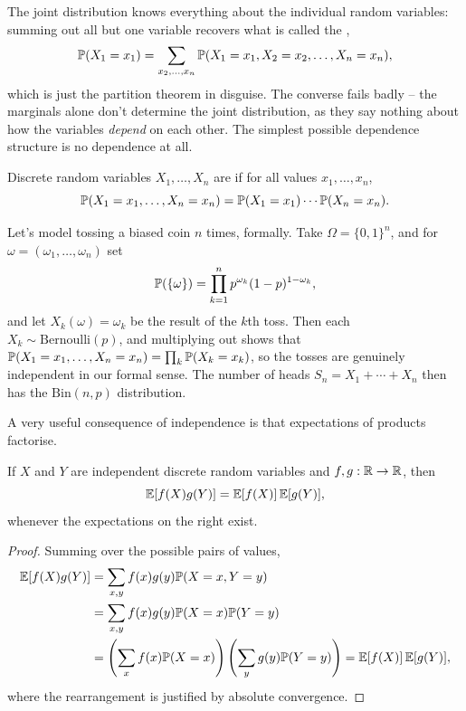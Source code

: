 \documentclass[a4paper]{scrartcl}
\begin{document}
The joint distribution knows everything about the individual random variables: summing out all but one variable recovers what is called the ,
$$
\mathbb{P}(X_1 = x_1) = \sum_{x_2, \dots, x_n} \mathbb{P}(X_1 = x_1, X_2 = x_2, \dots, X_n = x_n),
$$
which is just the partition theorem in disguise. The converse fails badly -- the marginals alone don't determine the joint distribution, as they say nothing about how the variables \emph{depend} on each other. The simplest possible dependence structure is no dependence at all.

\begin{definition}
	Discrete random variables $X_1, \dots, X_n$ are  if for all values $x_1, \dots, x_n$,
	$$
	\mathbb{P}(X_1 = x_1, \dots, X_n = x_n) = \mathbb{P}(X_1 = x_1) \cdots \mathbb{P}(X_n = x_n).
	$$
\end{definition}

\begin{example}
	Let's model tossing a biased coin $n$ times, formally. Take $\Omega = \{0, 1\}^n$, and for $\omega = (\omega_1, \dots, \omega_n)$ set
	$$
	\mathbb{P}(\{\omega\}) = \prod_{k=1}^n p^{\omega_k}(1 - p)^{1 - \omega_k},
	$$
	and let $X_k(\omega) = \omega_k$ be the result of the $k$th toss. Then each $X_k \sim \mathrm{Bernoulli}(p)$, and multiplying out shows that $\mathbb{P}(X_1 = x_1, \dots, X_n = x_n) = \prod_k \mathbb{P}(X_k = x_k)$, so the tosses are genuinely independent in our formal sense. The number of heads $S_n = X_1 + \cdots + X_n$ then has the $\mathrm{Bin}(n, p)$ distribution.
\end{example}

A very useful consequence of independence is that expectations of products factorise.

\begin{theorem}
	If $X$ and $Y$ are independent discrete random variables and $f, g: \mathbb{R} \rightarrow \mathbb{R}$, then
	$$
	\mathbb{E}[f(X)g(Y)] = \mathbb{E}[f(X)] \, \mathbb{E}[g(Y)],
	$$
	whenever the expectations on the right exist.
\end{theorem}
\begin{proof}
	Summing over the possible pairs of values,
	\begin{align*}
		\mathbb{E}[f(X)g(Y)] &= \sum_{x, y} f(x)g(y)\mathbb{P}(X = x, Y = y) \\
		&= \sum_{x, y} f(x)g(y)\mathbb{P}(X = x)\mathbb{P}(Y = y) \\
		&= \left(\sum_x f(x)\mathbb{P}(X = x)\right)\left(\sum_y g(y) \mathbb{P}(Y = y)\right) = \mathbb{E}[f(X)]\,\mathbb{E}[g(Y)],
	\end{align*}
	where the rearrangement is justified by absolute convergence.
\end{proof}
\end{document}
